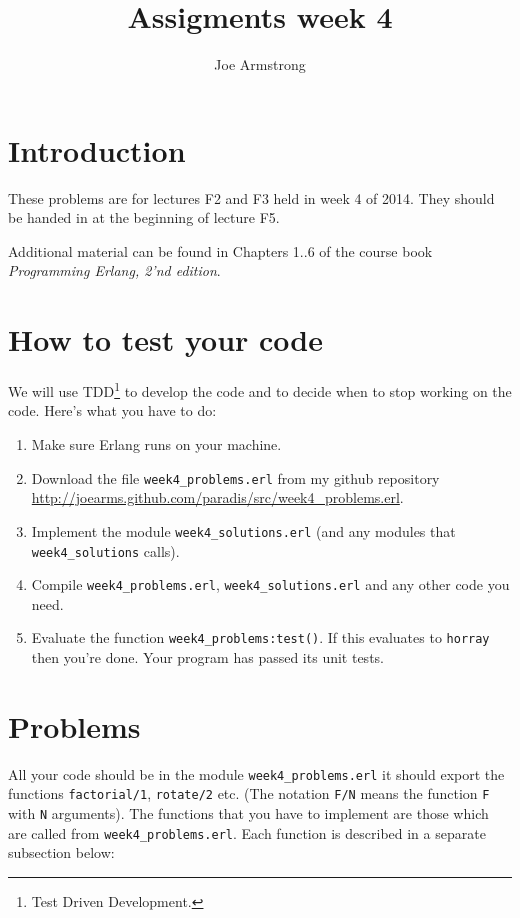 \documentclass[12pt]{article}
\title{Assigments week 4}
\author{Joe Armstrong}
\begin{document}
\maketitle

\tableofcontents

\section{Introduction}
These problems are for lectures F2 and F3 held in week 4 of 2014.
They should be handed in at the beginning of lecture F5.

Additional material can be found in Chapters 1..6 of
the course book {\sl Programming Erlang, 2'nd edition}. 

\section{How to test your code}

We will use TDD\footnote{Test Driven Development.} to develop the code
and to decide when to stop working on the code.
Here's what you have to do:

\begin{enumerate}
\item Make sure Erlang runs on your machine.

\item Download the file \verb+week4_problems.erl+ from my github repository
  \url{http://joearms.github.com/paradis/src/week4_problems.erl}.

\item Implement the module \verb+week4_solutions.erl+ (and any modules
that \verb+week4_solutions+ calls).

\item Compile \verb+week4_problems.erl+, \verb+week4_solutions.erl+ and
any other code you need.

\item Evaluate the function \verb+week4_problems:test()+. If this
  evaluates to \verb+horray+ then you're done. Your program has passed
  its unit tests.

\end{enumerate}

\section{Problems}

All your code should be in the module \verb+week4_problems.erl+ it
should export the functions \verb+factorial/1+, \verb+rotate/2+ etc.
(The notation \verb+F/N+ means the function \verb+F+ with \verb+N+
arguments).  The functions that you have to implement are those which
are called from \verb+week4_problems.erl+. Each function is described
in a separate subsection below:
\end{document}
